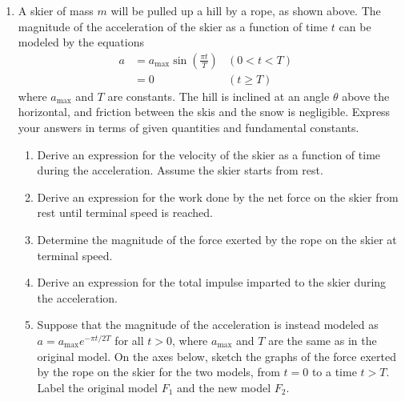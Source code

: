 \documentclass{../../../oss-classkick}
\begin{document}
\begin{enumerate}
\item A skier of mass $m$ will be pulled up a hill by a rope, as shown above.
  The magnitude of the acceleration of the skier as a function of time $t$ can
  be modeled by the equations
  \begin{align*}
    a &=a_\text{max}\sin\left(\frac{\pi t}{T}\right)  &(0<t<T)&\\
    &=0 & (t\geq T)&
  \end{align*}
  where $a_\text{max}$ and $T$ are constants. The hill is inclined at an angle
  $\theta$ above the horizontal, and friction between the skis and the snow is
  negligible. Express your answers in terms of given quantities and fundamental
  constants.
  \begin{enumerate}
  \item  Derive an expression for the velocity of the skier as a function of
    time during the acceleration. Assume the skier starts from rest.
  \item Derive an expression for the work done by the net force on the skier
    from rest until terminal speed is reached.
  \item Determine the magnitude of the force exerted by the rope on the skier
    at terminal speed.
  \item Derive an expression for the total impulse imparted to the skier during
    the acceleration.
  \item Suppose that the magnitude of the acceleration is instead modeled as
    $a=a_\text{max}e^{-\pi t/2T}$ for all $t > 0$, where $a_\text{max}$ and $T$
    are the same as in the original model. On the axes below, sketch the graphs
    of the force exerted by the rope on the skier for the two models, from
    $t=0$ to a time $t>T$. Label the original model $F_1$ and the new model
    $F_2$.
    \begin{center}
    \end{center}
  \end{enumerate}
  \newpage
  

\end{enumerate}
\end{document}
